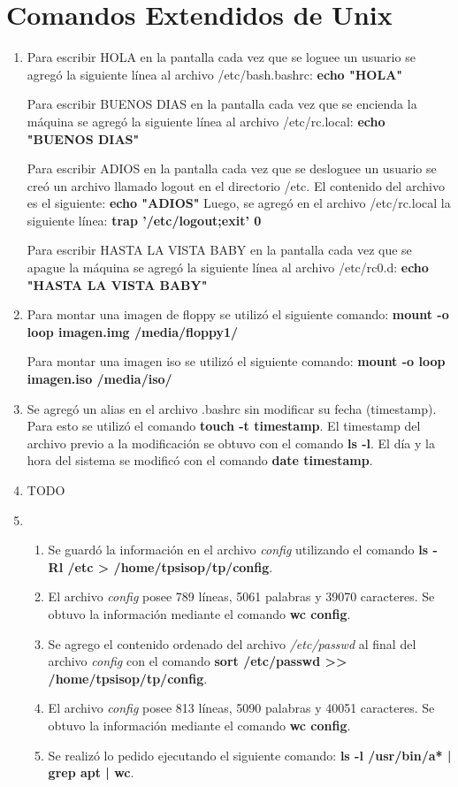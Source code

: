 \documentclass[a4paper,11pt] {article}
\begin{document}
\section{Comandos Extendidos de Unix}

\begin{enumerate}
	\item Para escribir HOLA en la pantalla cada vez que se loguee un usuario se agreg\'o la siguiente l\'inea al archivo 	/etc/bash.bashrc:
	\textbf{echo "HOLA"}
	
	Para escribir BUENOS DIAS en la pantalla cada vez que se encienda la m\'aquina se agreg\'o la siguiente l\'inea al 			archivo /etc/rc.local:
	\textbf{echo "BUENOS DIAS"}
	
	Para escribir ADIOS en la pantalla cada vez que se desloguee un usuario se cre\'o un archivo llamado logout en el 			directorio /etc. El contenido del archivo es el siguiente:
	\textbf{echo "ADIOS"}
	Luego, se agreg\'o en el archivo /etc/rc.local la siguiente l\'inea:
	\textbf{trap '/etc/logout;exit' 0}
	
	Para escribir HASTA LA VISTA BABY en la pantalla cada vez que se apague la m\'aquina se agreg\'o la siguiente l\'inea 	al archivo /etc/rc0.d:
	\textbf{echo "HASTA LA VISTA BABY"}
	
	\item Para montar una imagen de floppy se utiliz\'o el siguiente comando:
		\textbf{mount -o loop imagen.img /media/floppy1/}
		
		Para montar una imagen iso se utiliz\'o el siguiente comando:
		\textbf{mount -o loop imagen.iso /media/iso/}
		
	\item Se agreg\'o un alias en el archivo .bashrc sin modificar su fecha (timestamp). Para esto se utiliz\'o el comando \textbf{touch -t timestamp}. El timestamp del archivo previo a la modificaci\'on se obtuvo con el comando  \textbf{ls -l}.
	El d\'ia y la hora del sistema se modific\'o con el comando \textbf{date timestamp}.
	
	\item TODO
	\item
		\begin{enumerate}
			\item Se guard\'o la informaci\'on en el archivo \textit{config} utilizando el comando \textbf{ls -Rl /etc > 			/home/tpsisop/tp/config}.
			\item El archivo \textit{config} posee 789 l\'ineas, 5061 palabras y 39070 caracteres. Se obtuvo la informaci\'on mediante el comando \textbf{wc config}.
			\item Se agrego el contenido ordenado del archivo \textit{/etc/passwd} al final del archivo \textit{config} con el comando \textbf{sort /etc/passwd >> /home/tpsisop/tp/config}.
			\item El archivo \textit{config} posee 813 l\'ineas, 5090 palabras y 40051 caracteres. Se obtuvo la informaci\'on mediante el comando \textbf{wc config}.
			\item Se realiz\'o lo pedido ejecutando el siguiente comando: \textbf{ls -l /usr/bin/a* | grep apt | wc}.
		\end{enumerate}
	
\end{enumerate}
\end{document}

